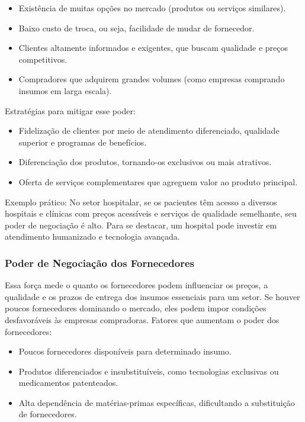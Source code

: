 \documentclass[11pt]{article}
\begin{document}
\begin{itemize}
\item Existência de muitas opções no mercado (produtos ou serviços similares).
\item Baixo custo de troca, ou seja, facilidade de mudar de fornecedor.
\item Clientes altamente informados e exigentes, que buscam qualidade e preços competitivos.
\item Compradores que adquirem grandes volumes (como empresas comprando insumos em larga escala).
\end{itemize}

Estratégias para mitigar esse poder:

\begin{itemize}
\item Fidelização de clientes por meio de atendimento diferenciado, qualidade superior e programas de benefícios.
\item Diferenciação dos produtos, tornando-os exclusivos ou mais atrativos.
\item Oferta de serviços complementares que agreguem valor ao produto principal.
\end{itemize}

\begingroup
\leftskip=4cm
\parindent=0pt
Exemplo prático: No setor hospitalar, se os pacientes têm acesso a diversos hospitais e clínicas com preços acessíveis e serviços de qualidade semelhante, seu poder de negociação é alto. Para se destacar, um hospital pode investir em atendimento humanizado e tecnologia avançada.
\par
\endgroup
\subsubsection{Poder de Negociação dos Fornecedores}
\label{sec:orgb5e3209}

Essa força mede o quanto os fornecedores podem influenciar os preços, a qualidade e os prazos de entrega dos insumos essenciais para um setor. Se houver poucos fornecedores dominando o mercado, eles podem impor condições desfavoráveis às empresas compradoras.
Fatores que aumentam o poder dos fornecedores:

\begin{itemize}
\item Poucos fornecedores disponíveis para determinado insumo.
\item Produtos diferenciados e insubstituíveis, como tecnologias exclusivas ou medicamentos patenteados.
\item Alta dependência de matérias-primas específicas, dificultando a substituição de fornecedores.
\end{itemize}
\end{document}
